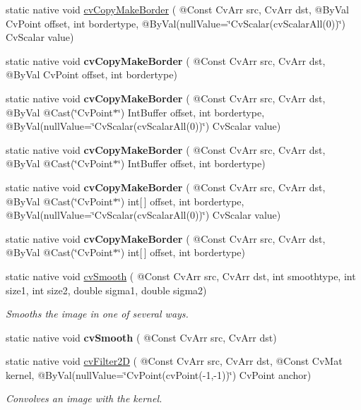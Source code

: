 \begin{DoxyCompactItemize}
\item 
static native void \hyperlink{group__imgproc__c_ga46ab19adc04378f8728b90f45240f5da}{cv\+Copy\+Make\+Border} ( @Const Cv\+Arr src, Cv\+Arr dst, @By\+Val Cv\+Point offset, int bordertype, @By\+Val(null\+Value=\char`\"{}Cv\+Scalar(cv\+Scalar\+All(0))\char`\"{}) Cv\+Scalar value)
\item 
static native void {\bfseries cv\+Copy\+Make\+Border} ( @Const Cv\+Arr src, Cv\+Arr dst, @By\+Val Cv\+Point offset, int bordertype)
\item 
static native void {\bfseries cv\+Copy\+Make\+Border} ( @Const Cv\+Arr src, Cv\+Arr dst, @By\+Val @Cast(\char`\"{}Cv\+Point$\ast$\char`\"{}) Int\+Buffer offset, int bordertype, @By\+Val(null\+Value=\char`\"{}Cv\+Scalar(cv\+Scalar\+All(0))\char`\"{}) Cv\+Scalar value)
\item 
static native void {\bfseries cv\+Copy\+Make\+Border} ( @Const Cv\+Arr src, Cv\+Arr dst, @By\+Val @Cast(\char`\"{}Cv\+Point$\ast$\char`\"{}) Int\+Buffer offset, int bordertype)
\item 
static native void {\bfseries cv\+Copy\+Make\+Border} ( @Const Cv\+Arr src, Cv\+Arr dst, @By\+Val @Cast(\char`\"{}Cv\+Point$\ast$\char`\"{}) int\mbox{[}$\,$\mbox{]} offset, int bordertype, @By\+Val(null\+Value=\char`\"{}Cv\+Scalar(cv\+Scalar\+All(0))\char`\"{}) Cv\+Scalar value)
\item 
static native void {\bfseries cv\+Copy\+Make\+Border} ( @Const Cv\+Arr src, Cv\+Arr dst, @By\+Val @Cast(\char`\"{}Cv\+Point$\ast$\char`\"{}) int\mbox{[}$\,$\mbox{]} offset, int bordertype)
\item 
static native void \hyperlink{group__imgproc__c_ga32746ef0800c2dfaad0e63fd8138362d}{cv\+Smooth} ( @Const Cv\+Arr src, Cv\+Arr dst, int smoothtype, int size1, int size2, double sigma1, double sigma2)
\begin{DoxyCompactList}\small\item\em Smooths the image in one of several ways. \end{DoxyCompactList}\item 
static native void {\bfseries cv\+Smooth} ( @Const Cv\+Arr src, Cv\+Arr dst)
\item 
static native void \hyperlink{group__imgproc__c_gaeb0ce4259621b5151099fcc7d4c25522}{cv\+Filter2D} ( @Const Cv\+Arr src, Cv\+Arr dst, @Const Cv\+Mat kernel, @By\+Val(null\+Value=\char`\"{}Cv\+Point(cv\+Point(-\/1,-\/1))\char`\"{}) Cv\+Point anchor)
\begin{DoxyCompactList}\small\item\em Convolves an image with the kernel. \end{DoxyCompactList}\item 

\end{DoxyCompactItemize}
